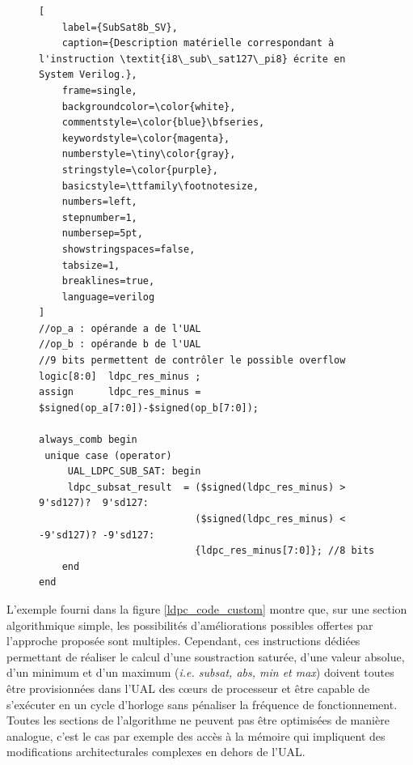 \documentclass[../main.tex]{subfiles}
\begin{document}
\begin{figure}[!tb]
\begin{lstlisting}[
    label={SubSat8b_SV},      
    caption={Description matérielle correspondant à l'instruction \textit{i8\_sub\_sat127\_pi8} écrite en System Verilog.},
    frame=single,
    backgroundcolor=\color{white},  
    commentstyle=\color{blue}\bfseries,
    keywordstyle=\color{magenta},
    numberstyle=\tiny\color{gray},
    stringstyle=\color{purple},
    basicstyle=\ttfamily\footnotesize,
    numbers=left,
    stepnumber=1,
    numbersep=5pt,                 
    showstringspaces=false,
    tabsize=1,
    breaklines=true,
    language=verilog
]
//op_a : opérande a de l'UAL 
//op_b : opérande b de l'UAL
//9 bits permettent de contrôler le possible overflow
logic[8:0]  ldpc_res_minus ; 
assign      ldpc_res_minus = $signed(op_a[7:0])-$signed(op_b[7:0]); 

always_comb begin
 unique case (operator)
     UAL_LDPC_SUB_SAT: begin 
     ldpc_subsat_result  = ($signed(ldpc_res_minus) >  9'sd127)?  9'sd127:
                           ($signed(ldpc_res_minus) < -9'sd127)? -9'sd127:
                           {ldpc_res_minus[7:0]}; //8 bits
    end
end
\end{lstlisting}
\end{figure}

L'exemple fourni dans la figure \ref{ldpc_code_custom} montre que, sur une section algorithmique simple, les possibilités d'améliorations possibles offertes par l'approche proposée sont multiples.
Cependant, ces instructions dédiées permettant de réaliser le calcul d'une soustraction saturée, d'une valeur absolue, d'un minimum et d'un maximum (\textit{i.e. subsat, abs, min et max}) doivent toutes être provisionnées dans l'UAL des cœurs de processeur et être capable de s'exécuter en un cycle d'horloge sans pénaliser la fréquence de fonctionnement. Toutes les sections de l'algorithme ne peuvent pas être optimisées de manière analogue, c'est le cas par exemple des accès à la mémoire qui impliquent des modifications architecturales complexes en dehors de l'UAL. 
\end{document}
